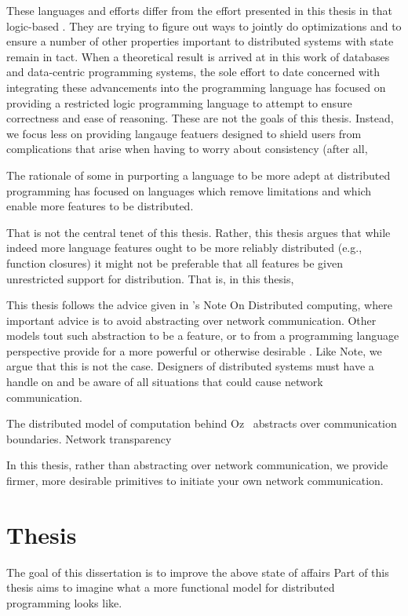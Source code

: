 These languages and efforts differ from the effort presented in this thesis in
that logic-based . They are trying to figure out ways to jointly do
optimizations and to ensure a number of other properties important to
distributed systems with state remain in tact. When a theoretical result is
arrived at in this work of databases and data-centric programming systems, the
sole effort to date concerned with integrating these advancements into the
programming language has focused on providing a restricted logic programming
language to attempt to ensure correctness and ease of reasoning. These are not
the goals of this thesis. Instead, we focus less on providing langauge featuers designed to shield users from complications that arise when having to worry about consistency (after all,


The rationale of some in purporting a language to be more adept at distributed
programming has focused on languages which remove limitations and which enable
more features to be distributed.

That is not the central tenet of this thesis. Rather, this thesis argues that
while indeed more language features ought to be more reliably distributed (e.g.,
function closures) it might not be preferable that all features be given
unrestricted support for distribution. That is, in this thesis,

This thesis follows the advice given in 's Note On Distributed computing, where
important advice is to avoid abstracting over network communication. Other
models tout such abstraction to be a feature, or to from a programming language
perspective provide for a more powerful or otherwise desirable . Like Note, we
argue that this is not the case. Designers of distributed systems must have a
handle on and be aware of all situations that could cause network communication.

The distributed model of computation behind Oz~\cite{DistributedOz} abstracts
over communication boundaries. Network transparency
~\cite{ConceptsTechniquesModelsProgramming}

In this thesis, rather than abstracting over network communication, we provide
firmer, more desirable primitives to initiate your own network communication.


\section{Thesis}

The goal of this dissertation is to improve the above state of affairs
Part of this thesis aims to imagine what a more functional model for distributed programming looks like.

